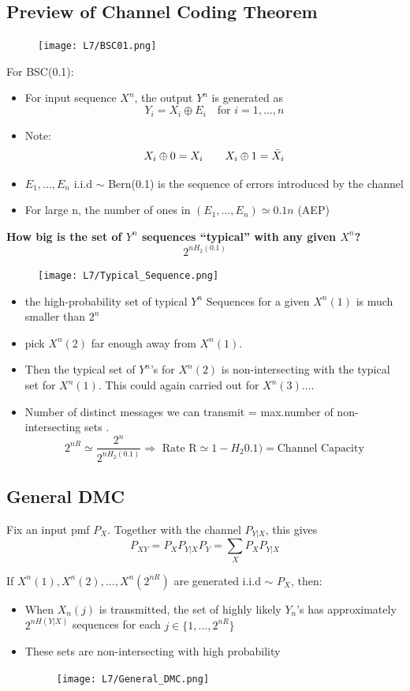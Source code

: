 \documentclass[12pt]{article}
\begin{document}
\subsection{Preview of Channel Coding Theorem}
\begin{figure}[H]
    \centering
    \texttt{[image: L7/BSC01.png]}
\end{figure}
For BSC(0.1):
\begin{itemize}
    \item For input sequence $X^n$, the output $Y^n $ is generated as 
    \[
    Y_i = X_i \oplus E_i \quad \textrm{for } i = 1,...,n
    \]
    \item Note:
    \[
    X_i \oplus 0 = X_i \qquad X_i \oplus 1 = \Bar{X}_i
    \]
    \item $E_1,...,E_n$ i.i.d $\sim$ Bern(0.1) is the sequence of errors introduced by the channel
    \item For large n, the number of ones in $(E_1,...,E_n) \simeq 0.1n$ (AEP)
\end{itemize}
{\large \textbf{How big is the set of $Y^n$ sequences ``typical'' with any given $X^n$? }}
\[
2^{n H_2(0.1)}
\]
\begin{figure}[H]
    \centering
    \texttt{[image: L7/Typical\_Sequence.png]}
\end{figure}
\begin{itemize}
    \item the high-probability set of typical $Y^n$ Sequences for a given $X^n(1)$ is much smaller than $2^n$
    \item pick $X^n(2)$ far enough away from $X^n(1)$.
    \item Then the typical set of $Y^n$'s for $X^n(2)$ is non-intersecting with the typical set for $X^n(1)$. This could again carried out for  $X^n(3)....$
    \item Number of distinct messages we can transmit = max.number of non-intersecting sets .
    \[
    2^{nR} \simeq \frac{2^n}{2^{nH_2(0.1)}} \Rightarrow \textrm{ Rate R} \simeq 1 - H_2 0.1) = \textrm{Channel Capacity}
    \]
\end{itemize}
\subsection{General DMC} 
Fix an input pmf $P_X$. Together with the channel $P_{Y|X}$, this gives 
\[
P_{XY} = P_X P_{Y|X} P_Y = \sum_X P_X P_{Y|X}
\]

If $X^n(1),X^n(2),...,X^n(2^{nR})$ are generated i.i.d $\sim$ $P_X$, then:
\begin{itemize}
    \item When $X_n(j)$ is transmitted, the set of highly likely $Y_n$'s has approximately $2^{nH(Y|X)}$ sequences for each $j\in \{ 1,...,2^{nR}\}$
    \item These sets are non-intersecting with high probability
    \begin{figure}[H]
        \centering
        \texttt{[image: L7/General\_DMC.png]}
    \end{figure}
\end{itemize}
\end{document}
